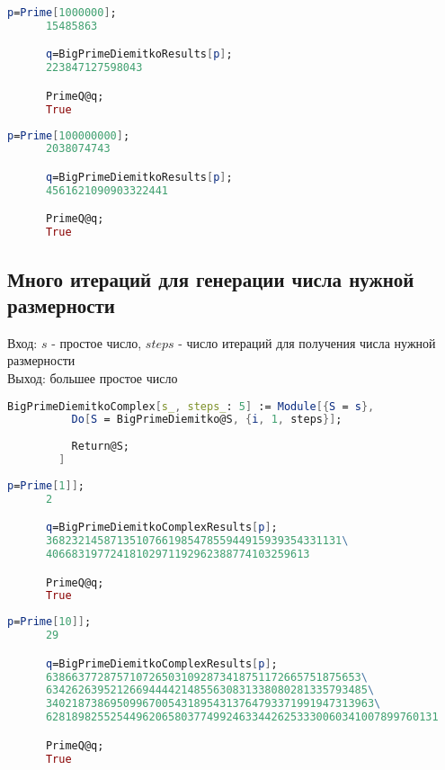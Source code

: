       \begin{lstlisting}[language=Mathematica,caption={Пример 1}]
      p=Prime[1000000];
      15485863

      q=BigPrimeDiemitkoResults[p];
      223847127598043

      PrimeQ@q;
      True
      \end{lstlisting}

      \begin{lstlisting}[language=Mathematica,caption={Пример 2}]
      p=Prime[100000000];
      2038074743

      q=BigPrimeDiemitkoResults[p];
      4561621090903322441

      PrimeQ@q;
      True
      \end{lstlisting}

    \subsection{Много итераций для генерации числа нужной размерности}
    
      Вход: {$s$} - простое число, {$steps$} - число итераций для получения числа нужной размерности \\
      Выход: большее простое число

      \begin{lstlisting}[language=Mathematica,caption={
	     Теорема Диемитко (много итераций)
      }]
    	BigPrimeDiemitkoComplex[s_, steps_: 5] := Module[{S = s},
    	  Do[S = BigPrimeDiemitko@S, {i, 1, steps}];
      
    	  Return@S;
    	]
      \end{lstlisting}

      \begin{lstlisting}[language=Mathematica,caption={Пример 1}]
      p=Prime[1]];
      2

      q=BigPrimeDiemitkoComplexResults[p];
      3682321458713510766198547855944915939354331131\
      40668319772418102971192962388774103259613

      PrimeQ@q;
      True
      \end{lstlisting}

      \begin{lstlisting}[language=Mathematica,caption={Пример 2}]
      p=Prime[10]];
      29

      q=BigPrimeDiemitkoComplexResults[p];
      6386637728757107265031092873418751172665751875653\
      63426263952126694444214855630831338080281335793485\
      340218738695099670054318954313764793371991947313963\
      6281898255254496206580377499246334426253330060341007899760131

      PrimeQ@q;
      True
      \end{lstlisting}

